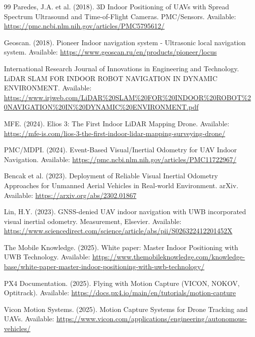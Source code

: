 \documentclass{EE-dyplom}
\begin{document}
\begin{thebibliography}{99}
Paredes, J.A. et al. (2018). 3D Indoor Positioning of UAVs with Spread Spectrum Ultrasound and Time-of-Flight Cameras. PMC/Sensors. Available: \url{https://pmc.ncbi.nlm.nih.gov/articles/PMC5795612/}

Geoscan. (2018). Pioneer Indoor navigation system - Ultrasonic local navigation system. Available: \url{https://www.geoscan.ru/en/products/pioneer/locus}

International Research Journal of Innovations in Engineering and Technology. LiDAR SLAM FOR INDOOR ROBOT NAVIGATION IN DYNAMIC ENVIRONMENT. Available: \url{https://www.irjweb.com/LiDAR\%20SLAM\%20FOR\%20INDOOR\%20ROBOT\%20NAVIGATION\%20IN\%20DYNAMIC\%20ENVIRONMENT.pdf}

MFE. (2024). Elios 3: The First Indoor LiDAR Mapping Drone. Available: \url{https://mfe-is.com/lios-3-the-first-indoor-lidar-mapping-surveying-drone/}

PMC/MDPI. (2024). Event-Based Visual/Inertial Odometry for UAV Indoor Navigation. Available: \url{https://pmc.ncbi.nlm.nih.gov/articles/PMC11722967/}

Bencak et al. (2023). Deployment of Reliable Visual Inertial Odometry Approaches for Unmanned Aerial Vehicles in Real-world Environment. arXiv. Available: \url{https://arxiv.org/abs/2302.01867}

Lin, H.Y. (2023). GNSS-denied UAV indoor navigation with UWB incorporated visual inertial odometry. Measurement, Elsevier. Available: \url{https://www.sciencedirect.com/science/article/abs/pii/S026322412201452X}

The Mobile Knowledge. (2025). White paper: Master Indoor Positioning with UWB Technology. Available: \url{https://www.themobileknowledge.com/knowledge-base/white-paper-master-indoor-positioning-with-uwb-technology/}

PX4 Documentation. (2025). Flying with Motion Capture (VICON, NOKOV, Optitrack). Available: \url{https://docs.px4.io/main/en/tutorials/motion-capture}

Vicon Motion Systems. (2025). Motion Capture Systems for Drone Tracking and UAVs. Available: \url{https://www.vicon.com/applications/engineering/autonomous-vehicles/}

\end{thebibliography}
\end{document}
